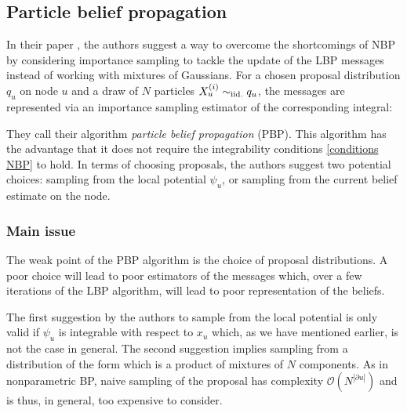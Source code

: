 \subsection{\label{point:PBP}Particle belief propagation}

In their paper \citep{ihler09}, the authors suggest a way to overcome the shortcomings of NBP by considering importance sampling to tackle the update of the LBP messages instead of working with mixtures of Gaussians. For a chosen proposal distribution $q_{u}$ on node $u$ and a draw of $N$ particles $X_{u}^{(i)}\sim_{\mathrm{iid.}} q_{u}$, the messages are represented via an importance sampling estimator of the corresponding integral:

They call their algorithm \emph{particle belief propagation} (PBP).
This algorithm has the advantage that it does not require the integrability conditions \eqref{conditions NBP} to hold. 
In terms of choosing proposals, the authors suggest two potential choices: sampling from the local potential $\psi_{u}$, or sampling from the current belief estimate on the node. 

\subsubsection{Main issue}

The weak point of the PBP algorithm is the choice of proposal distributions.  A poor choice will lead to poor estimators of the messages which, over a few iterations of the LBP algorithm, will lead to poor representation of the beliefs.

The first suggestion by the authors to sample from the local potential is only valid if $\psi_{u}$ is integrable with respect to $x_{u}$ which, as we have mentioned earlier, is not the case in general. The second suggestion implies sampling from a distribution of the form
%
%
which is a product of mixtures of $N$ components. As in nonparametric BP, naive sampling of the proposal has complexity $\mathcal O {(N^{|\partial {u}|})}$ and is thus, in general, too expensive to consider. 

